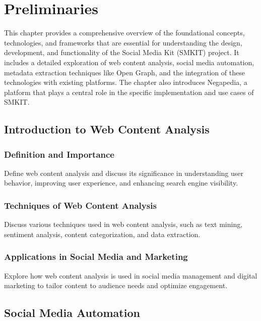 
\chapter{Preliminaries}
\label{ch:preliminaries}
This chapter provides a comprehensive overview of the foundational concepts, technologies, and frameworks that are essential for understanding the design, development, and functionality of the Social Media Kit (SMKIT) project.
It includes a detailed exploration of web content analysis, social media automation, metadata extraction techniques like Open Graph, and the integration of these technologies with existing platforms.
The chapter also introduces Negapedia, a platform that plays a central role in the specific implementation and use cases of SMKIT.

\section{Introduction to Web Content Analysis}
\label{sec:introduction_to_web_content_analysis}

\subsection{Definition and Importance}
\label{subsec:definition_and_importance}
Define web content analysis and discuss its significance in understanding user behavior, improving user experience, and enhancing search engine visibility.

\subsection{Techniques of Web Content Analysis}
\label{subsec:techniques_of_web_content_analysis}
Discuss various techniques used in web content analysis, such as text mining, sentiment analysis, content categorization, and data extraction.

\subsection{Applications in Social Media and Marketing}
\label{subsec:applications_in_social_media_and_marketing}
Explore how web content analysis is used in social media management and digital marketing to tailor content to audience needs and optimize engagement.

\section{Social Media Automation}
\label{sec:social_media_automation}

